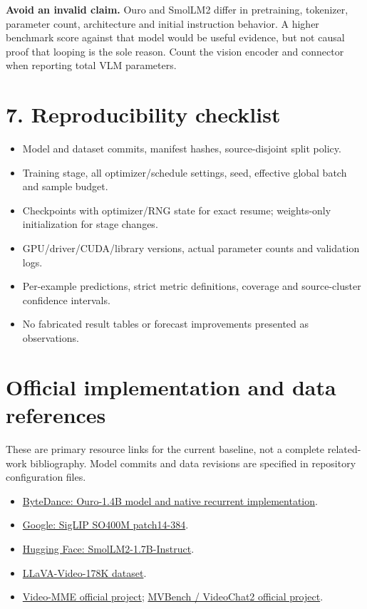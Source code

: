 \documentclass[10pt]{article}
\begin{document}
\textbf{Avoid an invalid claim.} Ouro and SmolLM2 differ in pretraining, tokenizer, parameter count, architecture and initial instruction behavior. A higher benchmark score against that model would be useful evidence, but not causal proof that looping is the sole reason. Count the vision encoder and connector when reporting total VLM parameters.

\section*{7. Reproducibility checklist}
\begin{itemize}
\item Model and dataset commits, manifest hashes, source-disjoint split policy.
\item Training stage, all optimizer/schedule settings, seed, effective global batch and sample budget.
\item Checkpoints with optimizer/RNG state for exact resume; weights-only initialization for stage changes.
\item GPU/driver/CUDA/library versions, actual parameter counts and validation logs.
\item Per-example predictions, strict metric definitions, coverage and source-cluster confidence intervals.
\item No fabricated result tables or forecast improvements presented as observations.
\end{itemize}

\section*{Official implementation and data references}
\small
These are primary resource links for the current baseline, not a complete related-work bibliography. Model commits and data revisions are specified in repository configuration files.
\begin{itemize}
\item \href{https://huggingface.co/ByteDance/Ouro-1.4B}{ByteDance: Ouro-1.4B model and native recurrent implementation}.
\item \href{https://huggingface.co/google/siglip-so400m-patch14-384}{Google: SigLIP SO400M patch14-384}.
\item \href{https://huggingface.co/HuggingFaceTB/SmolLM2-1.7B-Instruct}{Hugging Face: SmolLM2-1.7B-Instruct}.
\item \href{https://huggingface.co/datasets/lmms-lab/LLaVA-Video-178K}{LLaVA-Video-178K dataset}.
\item \href{https://github.com/MME-Benchmarks/Video-MME}{Video-MME official project}; \href{https://github.com/OpenGVLab/Ask-Anything/tree/main/video_chat2}{MVBench / VideoChat2 official project}.
\end{itemize}
\end{document}
